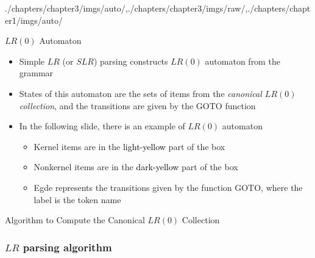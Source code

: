 \begin{graphicspathcontext}{{./chapters/chapter3/imgs/auto/},{./chapters/chapter3/imgs/raw/},{./chapters/chapter1/imgs/auto/}}
\begin{bibunit}[apalike]
\begin{frame}[background=9]{$LR(0)$ Automaton}
	\begin{itemize}
	\item Simple $LR$ (or $SLR$) parsing constructs $LR(0)$ automaton from the grammar
	\item States of this automaton are the sets of items from the \emph{canonical $LR(0)$ collection}, and the transitions are given by the GOTO function
	\vspace{1cm}
	\item In the following slide, there is an example of $LR(0)$ automaton
		\begin{itemize}
		\item Kernel items are in the \colorbox{DA53yellow}{\textcolor{black}{light-yellow}} part of the box
		\item Nonkernel items are in the \colorbox{DA53darkyellow}{\textcolor{black}{dark-yellow}} part of the box
		\item Egde represents the transitions given by the function GOTO, where the label is the token name
		\end{itemize}
	\end{itemize}
\end{frame}


\begin{frame}[t]{Algorithm to Compute the Canonical $LR(0)$ Collection}
	\begin{myalgorithm}
	\BlankLine
	\end{myalgorithm}
\end{frame}

\subsubsection{$LR$ parsing algorithm}
\subsubsectiontableofcontentslide


\end{bibunit}
\end{graphicspathcontext}
